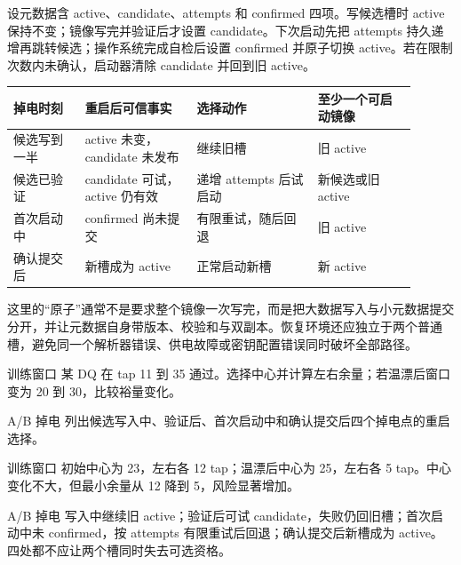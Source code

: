 设元数据含 active、candidate、attempts 和 confirmed 四项。写候选槽时 active 保持不变；镜像写完并验证后才设置 candidate。下次启动先把 attempts 持久递增再跳转候选；操作系统完成自检后设置 confirmed 并原子切换 active。若在限制次数内未确认，启动器清除 candidate 并回到旧 active。

\begin{longtable}{L{0.16\linewidth}L{0.25\linewidth}L{0.27\linewidth}L{0.22\linewidth}}
\toprule
掉电时刻 & 重启后可信事实 & 选择动作 & 至少一个可启动镜像 \\
\midrule
候选写到一半 & active 未变，candidate 未发布 & 继续旧槽 & 旧 active \\\tablerowrule
候选已验证 & candidate 可试，active 仍有效 & 递增 attempts 后试启动 & 新候选或旧 active \\\tablerowrule
首次启动中 & confirmed 尚未提交 & 有限重试，随后回退 & 旧 active \\\tablerowrule
确认提交后 & 新槽成为 active & 正常启动新槽 & 新 active \\
\bottomrule
\end{longtable}

这里的“原子”通常不是要求整个镜像一次写完，而是把大数据写入与小元数据提交分开，并让元数据自身带版本、校验和与双副本。恢复环境还应独立于两个普通槽，避免同一个解析器错误、供电故障或密钥配置错误同时破坏全部路径。

\begin{chapterexercise}{训练窗口}
某 DQ 在 tap 11 到 35 通过。选择中心并计算左右余量；若温漂后窗口变为 20 到 30，比较裕量变化。
\end{chapterexercise}

\begin{chapterexercise}{A/B 掉电}
列出候选写入中、验证后、首次启动中和确认提交后四个掉电点的重启选择。
\end{chapterexercise}

\begin{chapteranswer}{训练窗口}
初始中心为 23，左右各 12 tap；温漂后中心为 25，左右各 5 tap。中心变化不大，但最小余量从 12 降到 5，风险显著增加。
\end{chapteranswer}

\begin{chapteranswer}{A/B 掉电}
写入中继续旧 active；验证后可试 candidate，失败仍回旧槽；首次启动中未 confirmed，按 attempts 有限重试后回退；确认提交后新槽成为 active。四处都不应让两个槽同时失去可选资格。
\end{chapteranswer}
